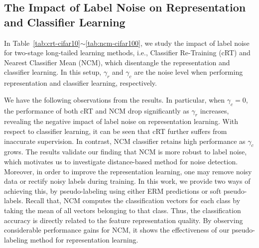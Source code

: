 \documentclass{article}
\begin{document}
\subsection{The Impact of Label Noise on Representation and Classifier Learning}
In Table~\ref{tab:crt-cifar10}$\sim$\ref{tab:ncm-cifar100}, we study the impact of label noise for two-stage long-tailed learning methods, i.e., Classifier Re-Training (cRT) and Nearest Classifier Mean (NCM), which disentangle the representation and classifier learning. In this setup, $\gamma_r$ and $\gamma_c$ are the noise level when performing representation and classifier learning, respectively. 

We have the following observations from the results. In particular, when $\gamma_c=0$, the performance of both cRT and NCM drop significantly as $\gamma_r$ increases, revealing the negative impact of label noise on representation learning. With respect to classifier learning, it can be seen that cRT further suffers from inaccurate supervision. In contrast, NCM classifier retains high performance as $\gamma_c$ grows. The results validate our finding that NCM is more robust to label noise, which motivates us to investigate distance-based method for noise detection. Moreover, in order to improve the representation learning, one may remove noisy data or rectify noisy labels during training. In this work, we provide two ways of achieving this, by pseudo-labeling using either ERM predictions or soft pseudo-labels. Recall that, NCM computes the classification vectors for each class by taking the mean of all vectors belonging to that
class. Thus, the classification accuracy is directly related to the feature representation quality. By observing considerable performance gains for NCM, it shows the effectiveness of our pseudo-labeling method for representation learning.
\end{document}
